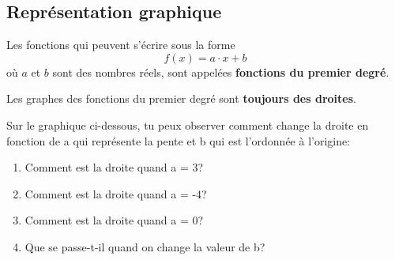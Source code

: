 \documentclass[a4paper,11pt]{article}
\begin{document}
\subsection{Représentation graphique}
Les fonctions qui peuvent s'écrire sous la forme
$$f(x)=a\cdot x +b$$
où $a$ et $b$ sont des nombres réels, sont appelées \textbf{fonctions du premier degré}.

Les graphes des fonctions du premier degré sont \textbf{toujours des droites}.

Sur le graphique ci-dessous, tu peux observer comment change la droite en fonction de a qui représente la pente et b qui est l'ordonnée à l'origine:\par
{} %
\begin{enumerate}
    \item Comment est la droite quand a = 3?
    \item Comment est la droite quand a = -4?
    \item Comment est la droite quand a = 0?
    \item Que se passe-t-il quand on change la valeur de b?
\end{enumerate}
\end{document}
